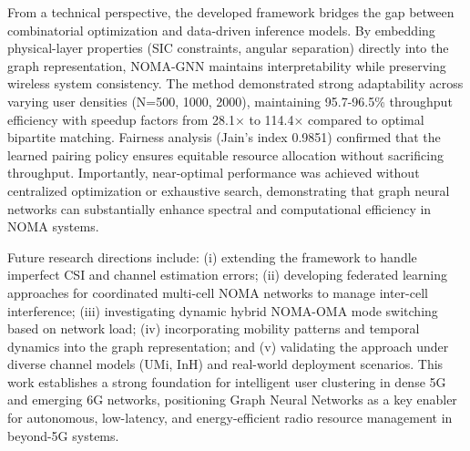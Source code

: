 \documentclass[conference]{IEEEtran}
\begin{document}
From a technical perspective, the developed framework bridges the gap between combinatorial optimization and data-driven inference models. By embedding physical-layer properties (SIC constraints, angular separation) directly into the graph representation, NOMA-GNN maintains interpretability while preserving wireless system consistency. The method demonstrated strong adaptability across varying user densities (N=500, 1000, 2000), maintaining 95.7-96.5\% throughput efficiency with speedup factors from 28.1$\times$ to 114.4$\times$ compared to optimal bipartite matching. Fairness analysis (Jain's index 0.9851) confirmed that the learned pairing policy ensures equitable resource allocation without sacrificing throughput. Importantly, near-optimal performance was achieved without centralized optimization or exhaustive search, demonstrating that graph neural networks can substantially enhance spectral and computational efficiency in NOMA systems.

Future research directions include: (i) extending the framework to handle imperfect CSI and channel estimation errors; (ii) developing federated learning approaches for coordinated multi-cell NOMA networks to manage inter-cell interference; (iii) investigating dynamic hybrid NOMA-OMA mode switching based on network load; (iv) incorporating mobility patterns and temporal dynamics into the graph representation; and (v) validating the approach under diverse channel models (UMi, InH) and real-world deployment scenarios. This work establishes a strong foundation for intelligent user clustering in dense 5G and emerging 6G networks, positioning Graph Neural Networks as a key enabler for autonomous, low-latency, and energy-efficient radio resource management in beyond-5G systems.







\end{document}
